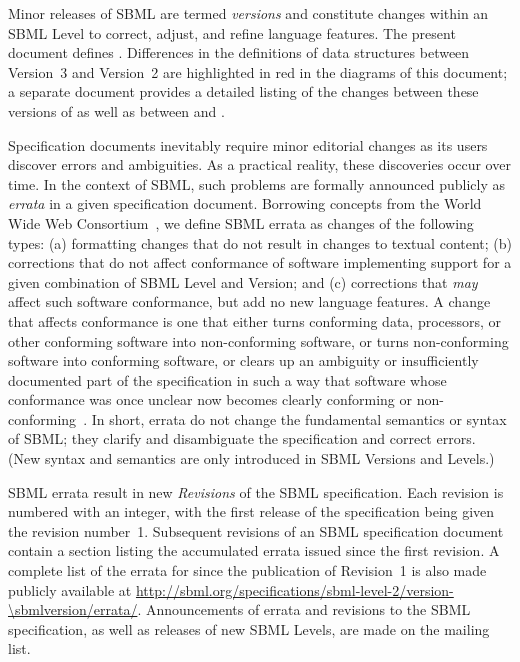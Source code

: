 Minor releases of SBML are termed \emph{versions} and constitute
changes within an SBML Level to correct, adjust, and refine
language features.  The present document defines .
Differences in the definitions of data structures between
Version~3 and Version~2 are highlighted in red in the diagrams of
this document; a separate document provides a detailed listing of
the changes between these versions of \sbmltwo as well as between
\changed{\sbmltwothree} and \sbmlonetwo.

Specification documents inevitably require minor editorial changes
as its users discover errors and ambiguities.  As a practical
reality, these discoveries occur over time.  In the context of
SBML, such problems are formally announced publicly as
\emph{errata} in a given specification document.  Borrowing
concepts from the World Wide Web Consortium~\citep{jacobs:2004},
we define SBML errata as changes of the following types: (a)
formatting changes that do not result in changes to textual
content; (b) corrections that do not affect conformance of
software implementing support for a given combination of SBML
Level and Version; and (c) corrections that \emph{may} affect such
software conformance, but add no new language features.  A change
that affects conformance is one that either turns conforming data,
processors, or other conforming software into non-conforming
software, or turns non-conforming software into conforming
software, or clears up an ambiguity or insufficiently documented
part of the specification in such a way that software whose
conformance was once unclear now becomes clearly conforming or
non-conforming~\citep{jacobs:2004}.  In short, errata do not
change the fundamental semantics or syntax of SBML; they clarify
and disambiguate the specification and correct errors.  (New
syntax and semantics are only introduced in SBML Versions and
Levels.)

SBML errata result in new \emph{Revisions} of the SBML
specification.  Each revision is numbered with an integer, with
the first release of the specification being given the revision
number~1.  Subsequent revisions of an SBML specification document
contain a section listing the accumulated errata issued since the
first revision.  A complete list of the errata for \changed{\sbmltwothree}
since the publication of Revision~1 is also made publicly
available at
\url{http://sbml.org/specifications/sbml-level-2/version-\sbmlversion/errata/}.
Announcements of errata and revisions to the SBML specification,
as well as releases of new SBML Levels, are made on the
 mailing
list.


